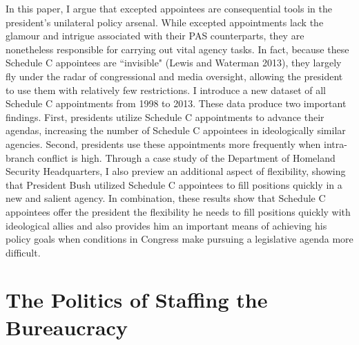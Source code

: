 \documentclass[12pt]{article}
\begin{document}
	In this paper, I argue that excepted appointees are consequential tools in the president's unilateral policy arsenal.  While excepted appointments lack the glamour and intrigue associated with their PAS counterparts, they are nonetheless responsible for carrying out vital agency tasks. In fact, because these Schedule C appointees are ``invisible" (Lewis and Waterman 2013), they largely fly under the radar of congressional and media oversight, allowing the president to use them with relatively few restrictions. 
	I introduce a new dataset of all Schedule C appointments from 1998 to 2013. These data produce two important findings. First, presidents utilize Schedule C appointments to advance their agendas, increasing the number of Schedule C appointees in ideologically similar agencies. Second, presidents use these appointments more frequently when intra-branch conflict is high. Through a case study of the Department of Homeland Security Headquarters, I also preview an additional aspect of flexibility, showing that President Bush utilized Schedule C appointees to fill positions quickly in a new and salient agency. In combination, these results show that Schedule C appointees offer the president the flexibility he needs to fill positions quickly with ideological allies and also provides him an important means of achieving his policy goals when conditions in Congress make pursuing a legislative agenda more difficult.
		
\section*{The Politics of Staffing the Bureaucracy}
\end{document}
